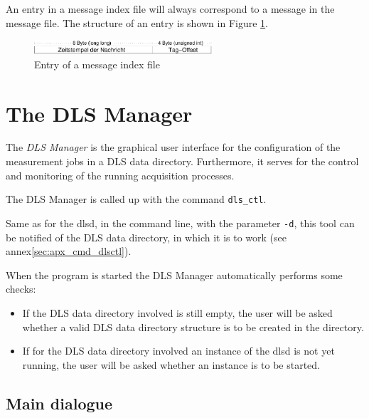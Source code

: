 \documentclass[a4paper,12pt,BCOR6mm,bibtotoc,idxtotoc]{scrbook}
\begin{document}
An entry in a message index file will always correspond to a message in the message file. The structure of an entry is shown in Figure \ref{fig:dls_data_index_msg}.

\begin{figure}[htb] \begin{center} \includegraphics[height=15pt]{bilder/dls_data_index_msg} \end{center} \caption{Entry of a message index file} \label{fig:dls_data_index_msg} \end{figure}




\chapter{The DLS Manager} \label{sec:manager}

The \textit{DLS Manager} is the graphical user interface for the configuration of the measurement jobs in a DLS data directory. Furthermore, it serves for the control and monitoring of the running acquisition processes.

The DLS Manager is called up with the command \texttt{dls\_ctl}.

Same as for the dlsd, in the command line, with the parameter \texttt{-d}, this tool can be notified of the DLS data directory, in which it is to work (see annex\ref{sec:apx_cmd_dlsctl}).

When the program is started the DLS Manager automatically performs some checks:

\begin{itemize} 
\item If the DLS data directory involved is still empty, the user will be asked whether a valid DLS data directory structure is to be created in the directory. 
\item If for the DLS data directory involved an instance of the dlsd is not yet running, the user will be asked whether an instance is to be started. \end{itemize}


\section{Main dialogue}
\end{document}
